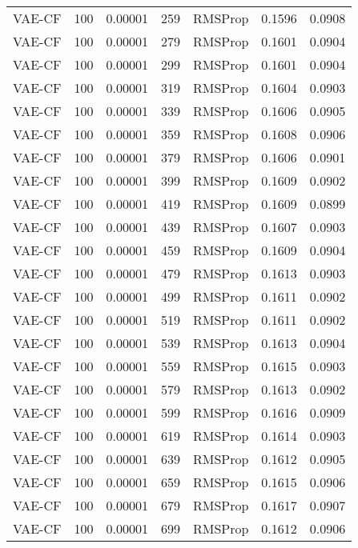 \begin{tabular}{llrllrr}
  VAE-CF &  100 &  0.00001 &   259 &   RMSProp &  0.1596 &       0.0908 \\
  VAE-CF &  100 &  0.00001 &   279 &   RMSProp &  0.1601 &       0.0904 \\
  VAE-CF &  100 &  0.00001 &   299 &   RMSProp &  0.1601 &       0.0904 \\
  VAE-CF &  100 &  0.00001 &   319 &   RMSProp &  0.1604 &       0.0903 \\
  VAE-CF &  100 &  0.00001 &   339 &   RMSProp &  0.1606 &       0.0905 \\
  VAE-CF &  100 &  0.00001 &   359 &   RMSProp &  0.1608 &       0.0906 \\
  VAE-CF &  100 &  0.00001 &   379 &   RMSProp &  0.1606 &       0.0901 \\
  VAE-CF &  100 &  0.00001 &   399 &   RMSProp &  0.1609 &       0.0902 \\
  VAE-CF &  100 &  0.00001 &   419 &   RMSProp &  0.1609 &       0.0899 \\
  VAE-CF &  100 &  0.00001 &   439 &   RMSProp &  0.1607 &       0.0903 \\
  VAE-CF &  100 &  0.00001 &   459 &   RMSProp &  0.1609 &       0.0904 \\
  VAE-CF &  100 &  0.00001 &   479 &   RMSProp &  0.1613 &       0.0903 \\
  VAE-CF &  100 &  0.00001 &   499 &   RMSProp &  0.1611 &       0.0902 \\
  VAE-CF &  100 &  0.00001 &   519 &   RMSProp &  0.1611 &       0.0902 \\
  VAE-CF &  100 &  0.00001 &   539 &   RMSProp &  0.1613 &       0.0904 \\
  VAE-CF &  100 &  0.00001 &   559 &   RMSProp &  0.1615 &       0.0903 \\
  VAE-CF &  100 &  0.00001 &   579 &   RMSProp &  0.1613 &       0.0902 \\
  VAE-CF &  100 &  0.00001 &   599 &   RMSProp &  0.1616 &       0.0909 \\
  VAE-CF &  100 &  0.00001 &   619 &   RMSProp &  0.1614 &       0.0903 \\
  VAE-CF &  100 &  0.00001 &   639 &   RMSProp &  0.1612 &       0.0905 \\
  VAE-CF &  100 &  0.00001 &   659 &   RMSProp &  0.1615 &       0.0906 \\
  VAE-CF &  100 &  0.00001 &   679 &   RMSProp &  0.1617 &       0.0907 \\
  VAE-CF &  100 &  0.00001 &   699 &   RMSProp &  0.1612 &       0.0906 \\

\end{tabular}
